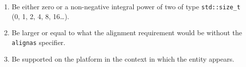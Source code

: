 \begin{enumerate}
\item{Be either zero or a non-negative integral power of two of type \lstinline!std::size_t! (0, 1, 2, 4, 8, 16\dots).}
\item{Be larger or equal to what the alignment requirement would be without the \lstinline!alignas! specifier.}
\item{Be supported on the platform in the context in which the entity appears.}
\end{enumerate}

